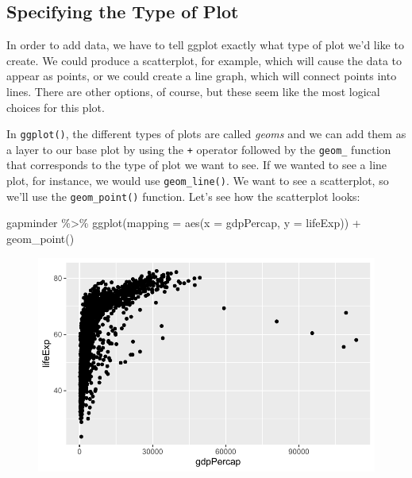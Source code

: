 \documentclass[
  letterpaper,
]{book}
\newenvironment{Shaded}{\begin{snugshade}}{\end{snugshade}}
\newcommand{\AttributeTok}[1]{\textcolor[rgb]{0.40,0.45,0.13}{#1}}
\newcommand{\FunctionTok}[1]{\textcolor[rgb]{0.28,0.35,0.67}{#1}}
\newcommand{\NormalTok}[1]{\textcolor[rgb]{0.00,0.23,0.31}{#1}}
\newcommand{\SpecialCharTok}[1]{\textcolor[rgb]{0.37,0.37,0.37}{#1}}
\begin{document}
\hypertarget{specifying-the-type-of-plot}{%
\subsection{Specifying the Type of
Plot}\label{specifying-the-type-of-plot}}

In order to add data, we have to tell ggplot exactly what type of plot
we'd like to create. We could produce a scatterplot, for example, which
will cause the data to appear as points, or we could create a line
graph, which will connect points into lines. There are other options, of
course, but these seem like the most logical choices for this plot.

In \texttt{ggplot()}, the different types of plots are called
\emph{geoms} and we can add them as a layer to our base plot by using
the \texttt{+} operator followed by the \texttt{geom\_} function that
corresponds to the type of plot we want to see. If we wanted to see a
line plot, for instance, we would use \texttt{geom\_line()}. We want to
see a scatterplot, so we'll use the \texttt{geom\_point()} function.
Let's see how the scatterplot looks:

\begin{Shaded}
\begin{Highlighting}[]
\NormalTok{gapminder }\SpecialCharTok{\%\textgreater{}\%}
  \FunctionTok{ggplot}\NormalTok{(}\AttributeTok{mapping =} \FunctionTok{aes}\NormalTok{(}\AttributeTok{x =}\NormalTok{ gdpPercap, }
                       \AttributeTok{y =}\NormalTok{ lifeExp)) }\SpecialCharTok{+}
  \FunctionTok{geom\_point}\NormalTok{()}
\end{Highlighting}
\end{Shaded}

\begin{figure}[H]

{\centering \includegraphics{visualizing-with-ggplot_files/figure-pdf/unnamed-chunk-16-1.pdf}

}

\end{figure}
\end{document}
